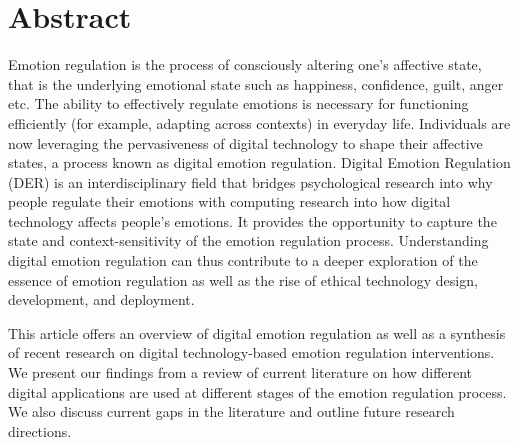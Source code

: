 \section*{Abstract}
Emotion regulation is the process of consciously altering one's affective state, that is the underlying emotional state such as happiness, confidence, guilt, anger etc. The ability to effectively regulate emotions is necessary for functioning efficiently (for example, adapting across contexts) in everyday life. Individuals are now leveraging the pervasiveness of digital technology to shape their affective states, a process known as digital emotion regulation. Digital Emotion Regulation (DER) is an interdisciplinary field that bridges psychological research into why people regulate their emotions with computing research into how digital technology affects people's emotions. It provides the opportunity to capture the state and context-sensitivity of the emotion regulation process. Understanding digital emotion regulation can thus contribute to a deeper exploration of the essence of emotion regulation as well as the rise of ethical technology design, development, and deployment. 

This article offers an overview of digital emotion regulation as well as a synthesis of recent research on digital technology-based emotion regulation interventions. We present our findings from a review of current literature on how different digital applications are used at different stages of the emotion regulation process. We also discuss current gaps in the literature and outline future research directions.